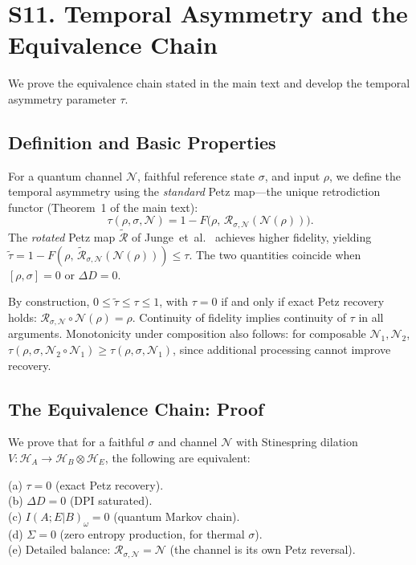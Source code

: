 \documentclass[prl,twocolumn,superscriptaddress,longbibliography]{revtex4-2}
\newcommand{\Petz}{\mathcal{R}}
\newcommand{\chan}{\mathcal{N}}
\newcommand{\hilb}{\mathcal{H}}
\newcommand{\tauasym}{\tau}
\newcommand{\taurot}{\tilde{\tau}}
\begin{document}
\section{S11. Temporal Asymmetry and the Equivalence Chain}
\label{sec:equiv_chain}

We prove the equivalence chain stated in the main text and develop
the temporal asymmetry parameter $\tauasym$.

\subsection{Definition and Basic Properties}

For a quantum channel $\chan$, faithful reference state $\sigma$, and
input $\rho$, we define the temporal asymmetry using the
\emph{standard} Petz map---the unique retrodiction functor
(Theorem~1 of the main text):
\begin{equation}
\tauasym(\rho, \sigma, \chan) = 1 - F\!\big(\rho,\,
  \Petz_{\sigma,\chan}(\chan(\rho))\big).
\end{equation}
The \emph{rotated} Petz map $\tilde{\Petz}$ of
Junge~et~al.~\cite{Junge2018} achieves higher fidelity,
yielding $\taurot = 1 - F(\rho,\,
\tilde{\Petz}_{\sigma,\chan}(\chan(\rho))) \leq \tauasym$.
The two quantities coincide when $[\rho,\sigma] = 0$ or
$\Delta D = 0$.

By construction, $0 \leq \taurot \leq \tauasym \leq 1$, with
$\tauasym = 0$ if and only if exact Petz recovery holds:
$\Petz_{\sigma,\chan} \circ \chan(\rho) = \rho$.
Continuity of fidelity implies continuity of $\tauasym$ in all
arguments. Monotonicity under composition also follows: for
composable $\chan_1, \chan_2$,
$\tauasym(\rho, \sigma, \chan_2 \circ \chan_1) \geq
\tauasym(\rho, \sigma, \chan_1)$, since additional processing
cannot improve recovery.

\subsection{The Equivalence Chain: Proof}

We prove that for a faithful $\sigma$ and channel $\chan$ with
Stinespring dilation $V: \hilb_A \to \hilb_B \otimes \hilb_E$, the
following are equivalent:

\noindent
(a) $\tauasym = 0$ (exact Petz recovery). \\
(b) $\Delta D = 0$ (DPI saturated). \\
(c) $I(A;E|B)_\omega = 0$ (quantum Markov chain). \\
(d) $\Sigma = 0$ (zero entropy production, for thermal $\sigma$). \\
(e) Detailed balance: $\Petz_{\sigma,\chan} = \chan$ (the channel
    is its own Petz reversal).
\end{document}
